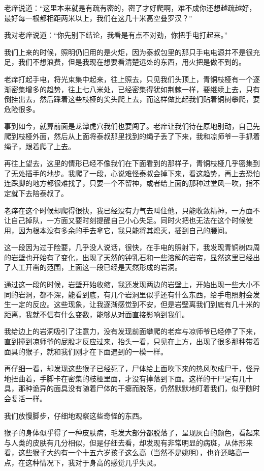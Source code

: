 老痒说道：“这里本来就是有疏有密的，密了才好爬啊，难不成你还想越疏越好，最好每一根都相距两米以上，我们在这几十米高空叠罗汉？”

我对老痒说道：“你先别下结论，我看是有点不对劲，你把手电打起来。”

我们上来的时候，照明仍旧用的是火炬，因为泰叔包里的那只手电电源并不是很充足，我们不想浪费，但是我现在想要看清楚远处的东西，用火把是做不到的。

老痒打起手电，将光束集中起来，往上照去，只见我们头顶上，青铜枝桠有一个逐渐密集增多的趋势，往上七八米处，已经密集得犹如荆棘一样，要继续上去，只有倒挂出去，然后踩着这些枝桠的尖头爬上去，而这样做比起我们贴着铜树攀爬，要危险很多。

事到如今，就算前面是龙潭虎穴我们也要闯了。老痒让我们待在原地别动，自己先爬到枝桠外面，然后从上面将泰叔那里找到的绳子丢了下来，我和凉师爷一手抓着绳子，跟着爬了上去。

再往上望去，这里的情形已经不像我们在下面看到的那样子，青铜枝桠几乎密集到了无处插手的地步。我爬了一段，心说难怪泰叔会掉下来，看这趋势，再上去恐怕连踩脚的地方都很难找了，只要一个不留神，或者给上面的那种过堂风一吹，指不定就下去陪泰叔了。

老痒在这个时候却爬得很快，我已经没有力气去叫住他，只能收敛精神，一方面不让自己掉队，一方面又要时刻提醒自己小心失足。同时火把也无法在这个时候使用，因为根本没有多余的手去拿它，我只能将其熄灭，插到自己的腰间。

这一段因为过于险要，几乎没人说话，很快，在手电的照射下，我发现青铜树四周的岩壁也开始有了变化，出现了天然的钟乳石和一些溶解的岩帘，显然这里已经出了人工开凿的范围，上面这一段已经是天然形成的岩洞。

通过这一段的时候，岩壁开始收缩，我还发现两边的岩壁上，开始出现一些大小不同的岩洞，都不深，能看到底，有几个岩洞里似乎还有什么东西，给手电照射会发生一定的反应。这些现象，让我逐渐感觉到不安，但是岩壁离我们到底有几十米的距离，我就不信有什么变数，能够从对面直接影响到我们。

我给边上的岩洞吸引了注意力，没有发现前面攀爬的老痒与凉师爷已经停了下来，直到撞到凉师爷的屁股才反应过来，抬头一看，只见在上方，出现了很多那种带着面具的猴子，就和我们刚才在下面遇到的一模一样。

再仔细一看，却发现这些猴子已经死了，尸体给上面吹下来的热风吹成尸干，怪异地扭曲着，手脚卡在密集的枝桠里面，才没有掉落到下面。这样的干尸足有几十具，那种诡异的面具没有随着尸体的干瘪而脱落，仍然默默地盯着我们，似乎随时会复活一样。

我们放慢脚步，仔细地观察这些奇怪的东西。

猴子的身体似乎得了一种皮肤病，毛发大部分都脱落了，呈现灰白的颜色，看起来与人类的皮肤有几分相似，但是仔细去看，却发现有非常明显的病斑，从体形来看，这些猴子大约有一个十五六岁孩子这么高（当然不是姚明），也许还略高一点，在这种情况下，我对于身高的感觉几乎失灵。

